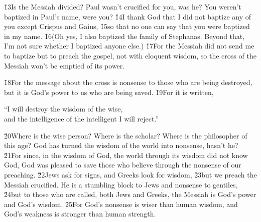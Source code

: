 \v{13}Is the Messiah divided? Paul wasn't crucified for you, was he? You weren't baptized in Paul's name, were you? \v{14}I thank God that I did not baptize any of you except Crispus and Gaius, \v{15}so that no one can say that you were baptized in my name. \v{16}(Oh yes, I also baptized the family of Stephanas. Beyond that, I'm not sure whether I baptized anyone else.) \v{17}For the Messiah did not send me to baptize but to preach the gospel, not with eloquent wisdom, so the cross of the Messiah won't be emptied of its power.

\v{18}For the message about the cross is nonsense to those who are being destroyed, but it is God's power to us who are being saved. \v{19}For it is written,

\begin{poetry}
\poeml ``I will destroy the wisdom of the wise, \\
\poemll    and the intelligence of the intelligent I will reject.''
\end{poetry}

\v{20}Where is the wise person? Where is the scholar? Where is the philosopher of this age? God has turned the wisdom of the world into nonsense, hasn't he? \v{21}For since, in the wisdom of God, the world through its wisdom did not know God, God was pleased to save those who believe through the nonsense of our preaching. \v{22}Jews ask for signs, and Greeks look for wisdom, \v{23}but we preach the Messiah crucified. He is a stumbling block to Jews and nonsense to gentiles, \v{24}but to those who are called, both Jews and Greeks, the Messiah is God's power and God's wisdom. \v{25}For God's nonsense is wiser than human wisdom, and God's weakness is stronger than human strength.

